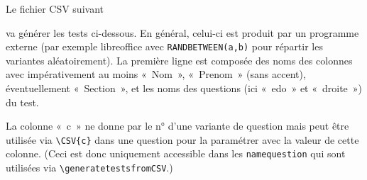 \documentclass[12pt,a4paper, rulers%
]{tests}
\begin{document}
\newpage
Le fichier CSV suivant

va générer les tests ci-dessous.  En général, celui-ci est produit
par un programme externe (par exemple libreoffice avec
\verb+RANDBETWEEN(a,b)+ pour répartir les variantes aléatoirement).
La première ligne est composée des noms des
colonnes avec impérativement au moins «~Nom~», «~Prenom~» (sans
accent), éventuellement «~Section~», et les noms des questions (ici
«~edo~» et «~droite~») du test.

La colonne «~c~» ne donne par le n° d'une variante de question mais
peut être utilisée via \verb+\CSV{c}+ dans une question pour la
paramétrer avec la valeur de cette colonne.  (Ceci est donc uniquement
accessible dans les \verb+namequestion+ qui sont utilisées via
\verb+\generatetestsfromCSV+.)

\end{document}
